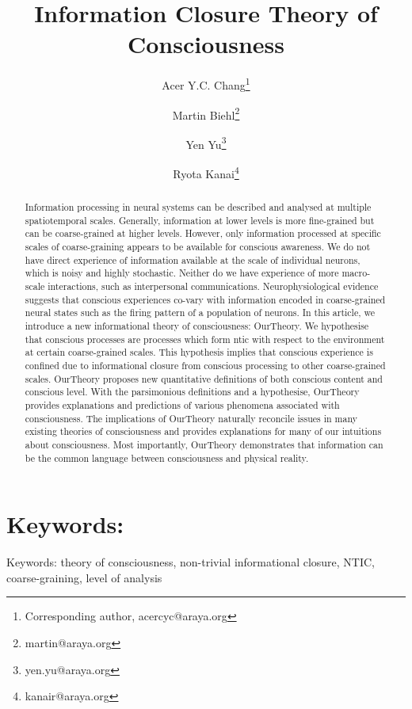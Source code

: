 \documentclass[utf8]{article}
\title{Information Closure Theory of Consciousness}
\date{}
\author[]{Acer Y.C. Chang\thanks{Corresponding author, acercyc@araya.org}}
\author[]{Martin Biehl\thanks{martin@araya.org}}
\author[]{Yen Yu\thanks{yen.yu@araya.org}}
\author[]{Ryota Kanai\thanks{kanair@araya.org }}
\affil[]{ARAYA, Inc., Tokyo, Japan}
\begin{document}
	\maketitle
	\tableofcontents


	\begin{abstract}
		Information processing in neural systems can be described and analysed at multiple spatiotemporal scales. Generally, information at lower levels is more fine-grained but can be coarse-grained at higher levels. However, only information processed at specific scales of coarse-graining appears to be available for conscious awareness. We do not have direct experience of information available at the scale of individual neurons, which is noisy and highly stochastic. Neither do we have experience of more macro-scale interactions, such as interpersonal communications. Neurophysiological evidence suggests that conscious experiences co-vary with information encoded in coarse-grained neural states such as the firing pattern of a population of neurons. In this article, we introduce a new informational theory of consciousness: \acf{OurTheory}. We hypothesise that conscious processes are processes which form \ac{ntic} with respect to the environment at certain coarse-grained scales. This hypothesis implies that conscious experience is confined due to informational closure from conscious processing to other coarse-grained scales. \ac{OurTheory} proposes new quantitative definitions of both conscious content and conscious level. With the parsimonious definitions and a hypothesise, \ac{OurTheory} provides explanations and predictions of various phenomena associated with consciousness. The implications of \ac{OurTheory} naturally reconcile issues in many existing theories of consciousness and provides explanations for many of our intuitions about consciousness. Most importantly, \ac{OurTheory} demonstrates that information can be the common language between consciousness and physical reality.

		
	\end{abstract}


	\section*{Keywords:}
	Keywords: theory of consciousness, non-trivial informational closure, NTIC, coarse-graining, level of analysis

\end{document}
